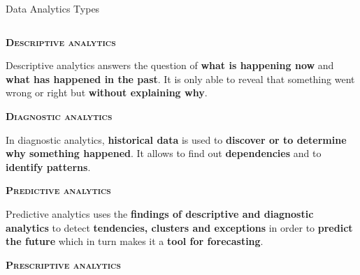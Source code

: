 \documentclass[main.tex]{subfiles}
\begin{document}
    \begin{frame}{Data Analytics Types}
        \begin{columns}
            \begin{column}{.6\textwidth}
                \begin{justify}
                    \alert{\textbf{\textsc{Descriptive analytics}}}
                    
                    Descriptive analytics answers the question of \textbf{what is happening now} and \textbf{what has happened in the past}. It is only able to reveal that something went wrong or right but \textbf{without explaining why}.
                    \vspace*{2mm}
                    
                    \alert{\textbf{\textsc{Diagnostic analytics}}}
                    
                    In diagnostic analytics, \textbf{historical data} is used to \textbf{discover or to determine why something happened}. It allows to find out \textbf{dependencies} and to \textbf{identify patterns}.
                    
                    \vspace*{2mm}
                    
                    \alert{\textbf{\textsc{Predictive analytics}}}
                    
                    Predictive analytics uses the \textbf{findings of descriptive and diagnostic analytics} to detect \textbf{tendencies, clusters and exceptions} in order to \textbf{predict the future} which in turn makes it a \textbf{tool for forecasting}. 
                    
                    \vspace*{2mm}
                    
                    \alert{\textbf{\textsc{Prescriptive analytics}}}
                    

\end{justify}
\end{column}
\end{columns}
\end{frame}
\end{document}
